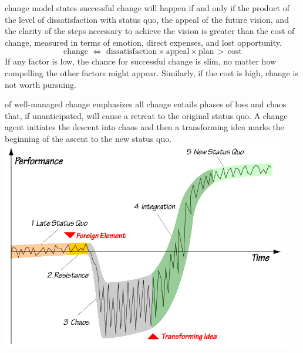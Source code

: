 \documentclass{tufte-handout}
\begin{document}
\maketitle

 change model%
states successful change will happen if and only if the product of the
level of dissatisfaction with status quo, the appeal of the future
vision, and the clarity of the steps necessary to achieve the vision is
greater than the cost of change, measured in terms of emotion, direct
expenses, and lost opportunity.
\begin{displaymath}
  \text{change}
  \,\,\iff\,\,
  \text{dissatisfaction}\times\text{appeal}\times\text{plan}
  \,>\,
  \text{cost}
\end{displaymath}
If any factor is low, the chance for successful change is slim, no matter
how compelling the other factors might appear.
Similarly, if the cost is high, change is not worth pursuing.

 of well-managed change%
emphasizes all change entails phases of loss and chaos that, if
unanticipated, will cause a retreat to the original status quo.
A change agent initiates the descent into chaos and then a transforming
idea marks the beginning of the ascent to the new status quo.
\includegraphics{satir_graph}
\end{document}
